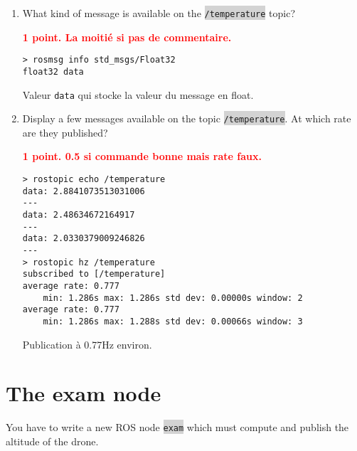 \documentclass[10pt,a4paper,english]{exam}
\newcounter{mainmemorder}
\newcommand{\save}{\setcounter{mainmemorder}{\value{enumi}}}
\newcommand{\mytext}[1]{\colorbox{lightgray}{\texttt{#1}}}
\begin{document}
\begin{enumerate}
	\item What kind of message is available on the \mytext{/temperature} topic?
	      \begin{solution}\textbf{\textcolor{red}{1 point. La moitié si pas de commentaire.}}
		      \begin{verbatim}
> rosmsg info std_msgs/Float32
float32 data
		\end{verbatim}
		      Valeur \texttt{data} qui stocke la valeur du message en float.
	      \end{solution}
	\item Display a few messages available on the topic \mytext{/temperature}. At which rate are they
	      published?
	      \begin{solution}\textbf{\textcolor{red}{1 point. 0.5 si commande bonne mais rate faux.}}
		      \begin{verbatim}
> rostopic echo /temperature
data: 2.8841073513031006
---
data: 2.48634672164917
---
data: 2.0330379009246826
---
> rostopic hz /temperature
subscribed to [/temperature]
average rate: 0.777
	min: 1.286s max: 1.286s std dev: 0.00000s window: 2
average rate: 0.777
	min: 1.286s max: 1.288s std dev: 0.00066s window: 3\end{verbatim}
		      Publication à 0.77Hz environ.
	      \end{solution}
	      \save
\end{enumerate}

\section{The exam node}

You have to write a new ROS node \mytext{exam} which must compute and publish the altitude of the
drone.
\end{document}
